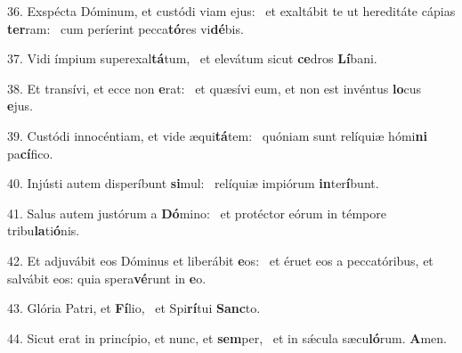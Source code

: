36. Exspécta Dóminum, et custódi viam ejus: \dag\  et exaltábit te ut hereditáte cápias \textbf{ter}ram: \ast\  cum períerint pecca\textbf{tó}res vi\textbf{dé}bis.\

37. Vidi ímpium superexal\textbf{tá}tum, \ast\  et elevátum sicut \textbf{ce}dros \textbf{Lí}bani.\

38. Et transívi, et ecce non \textbf{e}rat: \ast\  et quæsívi eum, et non est invéntus \textbf{lo}cus \textbf{e}jus.\

39. Custódi innocéntiam, et vide æqui\textbf{tá}tem: \ast\  quóniam sunt relíquiæ hómi\textbf{ni} pa\textbf{cí}fico.\

40. Injústi autem disperíbunt \textbf{si}mul: \ast\  relíquiæ impiórum \textbf{in}ter\textbf{í}bunt.\

41. Salus autem justórum a \textbf{Dó}mino: \ast\  et protéctor eórum in témpore tribu\textbf{la}ti\textbf{ó}nis.\

42. Et adjuvábit eos Dóminus et liberábit \textbf{e}os: \ast\  et éruet eos a peccatóribus, et salvábit eos: quia spera\textbf{vé}runt in \textbf{e}o.\

43. Glória Patri, et \textbf{Fí}lio, \ast\  et Spi\textbf{rí}tui \textbf{Sanc}to.\

44. Sicut erat in princípio, et nunc, et \textbf{sem}per, \ast\  et in sǽcula sæcu\textbf{ló}rum. \textbf{A}men.\

